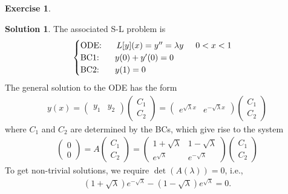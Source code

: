 \documentclass{article}
\theoremstyle{definition}
\newtheorem*{exer*}{Exercise}
\newtheorem*{sln*}{Solution}
\begin{document}
\begin{exer*}
\begin{enumerate}
\begin{sln*}
	 		The associated S-L problem is
	 		\begin{align*}
	 		\begin{cases}
	 		\text{ODE: }\hspace{0.5cm} L[y](x) = y'' = \lambda y\hspace{0.5cm} 0<x<1\\
	 		\text{BC1: }\hspace{0.5cm} y(0) + y'(0) = 0\\
	 		\text{BC2: }\hspace{0.5cm} y(1) = 0
	 		\end{cases}
	 		\end{align*}
	 		The general solution to the ODE has the form
	 		\begin{align*}
	 		y(x) = \begin{pmatrix}
	 		y_1 & y_2
	 		\end{pmatrix}\begin{pmatrix}
	 		C_1\\C_2
	 		\end{pmatrix}= 
	 		\begin{pmatrix}
	 		e^{\sqrt{\lambda}x}&e^{-\sqrt{\lambda} x}
	 		\end{pmatrix}
	 		\begin{pmatrix}
	 		C_1\\C_2
	 		\end{pmatrix}
	 		\end{align*}
	 	where $C_1$ and $C_2$ are determined by the BCs, which give rise to the system 
	 	\begin{align*}
	 	\begin{pmatrix}
	 	0\\0
	 	\end{pmatrix} = A\begin{pmatrix}
	 	C_1\\C_2
	 	\end{pmatrix} = \begin{pmatrix}
	 	1 + \sqrt{\lambda} &  1 -\sqrt{\lambda}  \\  e^{\sqrt{\lambda}}  & e^{-\sqrt{\lambda}} 
 	 	\end{pmatrix}
	 	\begin{pmatrix}
	 	C_1\\C_2
	 	\end{pmatrix}
	 	\end{align*}	
	 	To get non-trivial solutions, we require $\det(A(\lambda)) = 0$, i.e., 
	 	\begin{align*}
	 	(1+\sqrt{\lambda})e^{-\sqrt{\lambda}} - (1-\sqrt{\lambda})e^{\sqrt{\lambda}} = 0. 

\end{align*}
\end{sln*}
\end{enumerate}
\end{exer*}
\end{document}
